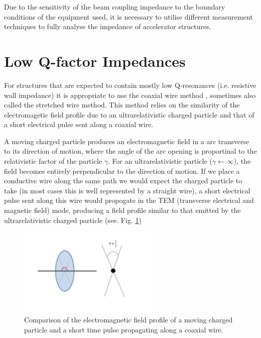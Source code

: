 

Due to the sensitivity of the beam coupling impedance to the boundary conditions of the equipment used, it is necessary to utilise different measurement techniques to fully analyse the impedance of accelerator structures.

\section{Low Q-factor Impedances}
\label{sec:coax_wire_meth}

For structures that are expected to contain mostly low Q-resonances (i.e. resistive wall impedance) it is appropriate to use the coaxial wire method \cite{Gluckstern:WireMeasImp, Vaccaro:ImprovedWireMeth}, sometimes also called the stretched wire method. This method relies on the similarity of the electromagetic field profile due to an ultrarelativistic charged particle and that of a short electrical pulse sent along a coaxial wire. 

A moving charged particle produces an electromagnetic field in a arc transverse to its direction of motion, where the angle of the arc opening is proportinal to the relativistic factor of the particle $\gamma$. For an ultrarelativistic particle ($\gamma \leftarrow \infty$), the field becomes entirely perpendicular to the direction of motion. If we place a conductive wire along the same path we would expect the charged particle to take (in most cases this is well represented by a straight wire), a short electrical pulse sent along this wire would propogate in the TEM (transverse electrical and magnetic field) mode, producing a field profile similar to that emitted by the ultrarelativistic charged particle (see. Fig. \ref{fig:coax-part-profile})


\begin{figure}
\begin{center}
\includegraphics[width=0.6\textwidth]{Bench_Top_Measurements/figures/coaxial-particle-fields.pdf}
\end{center}
\caption{Comparison of the electromagnetic field profile of a moving charged particle and a short time pulse propagating along a coaxial wire.}
\label{fig:coax-part-profile}
\end{figure}

